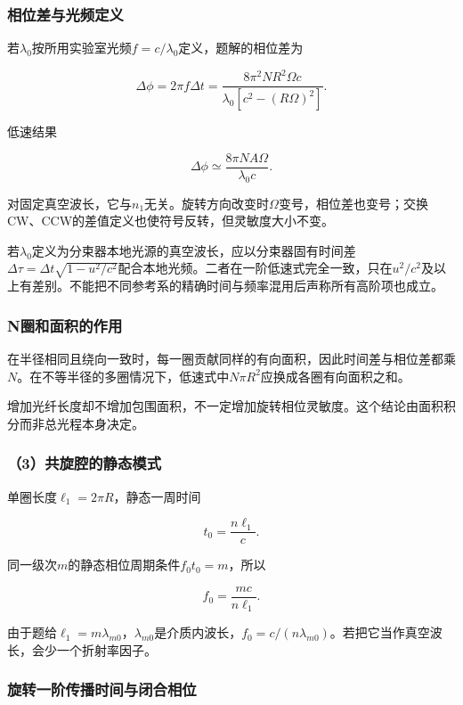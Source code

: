 \documentclass[12pt,a4paper,fontset=fandol]{ctexart}
\begin{document}
\subsubsection{相位差与光频定义}\label{ux76f8ux4f4dux5deeux4e0eux5149ux9891ux5b9aux4e49}

若\(\lambda_0\)按所用实验室光频\(f=c/\lambda_0\)定义，题解的相位差为

\[
\boxed{
\Delta\phi=2\pi f\Delta t
=\frac{8\pi^2NR^2\Omega c}
{\lambda_0[c^2-(R\Omega)^2]}}.
\]

低速结果

\[
\boxed{
\Delta\phi\simeq
\frac{8\pi N A\Omega}{\lambda_0c}}.
\]

对固定真空波长，它与\(n_1\)无关。旋转方向改变时\(\Omega\)变号，相位差也变号；交换CW、CCW的差值定义也使符号反转，但灵敏度大小不变。

若\(\lambda_0\)定义为分束器本地光源的真空波长，应以分束器固有时间差\(\Delta\tau=\Delta t\sqrt{1-u^2/c^2}\)配合本地光频。二者在一阶低速式完全一致，只在\(u^2/c^2\)及以上有差别。不能把不同参考系的精确时间与频率混用后声称所有高阶项也成立。

\subsubsection{N圈和面积的作用}\label{nux5708ux548cux9762ux79efux7684ux4f5cux7528}

在半径相同且绕向一致时，每一圈贡献同样的有向面积，因此时间差与相位差都乘\(N\)。在不等半径的多圈情况下，低速式中\(N\pi R^2\)应换成各圈有向面积之和。

增加光纤长度却不增加包围面积，不一定增加旋转相位灵敏度。这个结论由面积积分而非总光程本身决定。

\subsubsection{（3）共旋腔的静态模式}\label{ux5171ux65cbux8154ux7684ux9759ux6001ux6a21ux5f0f}

单圈长度\(\ell_1=2\pi R\)，静态一周时间

\[
t_0=\frac{n\ell_1}{c}.
\]

同一级次\(m\)的静态相位周期条件\(f_0t_0=m\)，所以

\[
f_0=\frac{mc}{n\ell_1}.
\]

由于题给\(\ell_1=m\lambda_{m0}\)，\(\lambda_{m0}\)是介质内波长，\(f_0=c/(n\lambda_{m0})\)。若把它当作真空波长，会少一个折射率因子。

\subsubsection{旋转一阶传播时间与闭合相位}\label{ux65cbux8f6cux4e00ux9636ux4f20ux64adux65f6ux95f4ux4e0eux95edux5408ux76f8ux4f4d}
\end{document}
